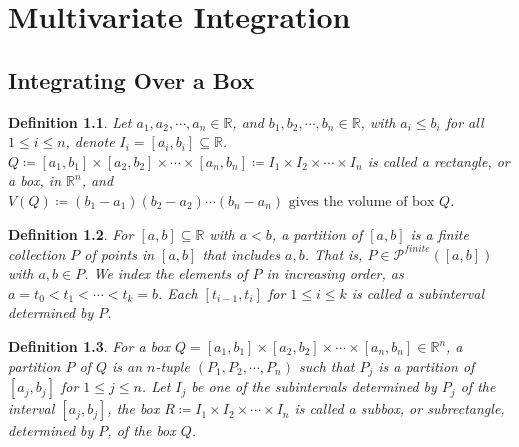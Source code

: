 \documentclass[15pt]{book}
\theoremstyle{break}
\theoremstyle{break}
\newtheorem{defn}{Definition}[corL]
\newcommand{\R}{\mathbb{R}}
\newcommand{\Power}{\mathcal{P}}
\begin{document}
\newpage
\chapter{Multivariate Integration}
\setcounter{section}{9}
\section[Integrating Over a Box]{\color{red} Integrating Over a Box \color{black}}
\begin{defn}
Let $a_1,a_2,\cdots, a_n \in \R$, and $b_1,b_2,\cdots,b_n \in \R$, with $a_i \leq b_i$ for all $1 \leq i \leq n$, denote $I_i = [a_i, b_i]\subseteq \R$. $Q \coloneqq [a_1,b_1] \times [a_2,b_2] \times \cdots \times [a_n,b_n] \coloneqq I_1\times I_2 \times \cdots \times I_n$ is called a rectangle, or a box, in  $\R^n$, and $V(Q) \coloneqq (b_1-a_1)(b_2-a_2) \cdots (b_n-a_n) \text{ gives the volume of box }Q$.
\end{defn}
\begin{defn}
For $[a,b]\subseteq \R$ with $a<b$, a partition of $[a,b]$ is a finite collection $P$ of points in $[a,b]$ that includes $a,b$. That is, $P \in \Power^{finite} ([a,b])$ with $a,b\in P$. We index the elements of $P$ in increasing order, as $a =t_0 < t_1 < \cdots < t_k = b$. Each $[t_{i-1},t_i]$ for $1\leq i \leq k$ is called a subinterval determined by $P$.
\end{defn}
\begin{defn}
For a box $Q = [a_1,b_1] \times [a_2,b_2] \times \cdots \times [a_n,b_n] \in \R^n$, a partition $P$ of $Q$ is an $n$-tuple $(P_1,P_2,\cdots,P_n)$ such that $P_j$ is a partition of $[a_j,b_j]$ for $1 \leq j \leq n$. Let $I_j$ be one of the subintervals determined by $P_j$ of the interval $[a_j,b_j]$, the box $R\coloneqq I_1 \times I_2 \times \cdots \times I_n$ is called a subbox, or subrectangle, determined by $P$, of the box $Q$. 
\end{defn}
\end{document}
